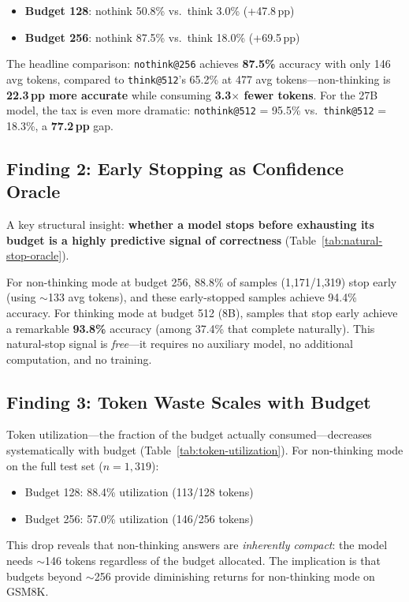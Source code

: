 \begin{itemize}[nosep,leftmargin=*]
    \item \textbf{Budget 128}: nothink 50.8\% vs.\ think 3.0\% (+47.8\,pp)
    \item \textbf{Budget 256}: nothink 87.5\% vs.\ think 18.0\% (+69.5\,pp)
\end{itemize}

The headline comparison: \texttt{nothink@256} achieves \textbf{87.5\%} accuracy with only 146 avg tokens, compared to \texttt{think@512}'s 65.2\% at 477 avg tokens---non-thinking is \textbf{22.3\,pp more accurate} while consuming \textbf{3.3$\times$ fewer tokens}.
For the 27B model, the tax is even more dramatic: \texttt{nothink@512} = 95.5\% vs.\ \texttt{think@512} = 18.3\%, a \textbf{77.2\,pp} gap.

\subsection{Finding 2: Early Stopping as Confidence Oracle}
\label{sec:finding2}



A key structural insight: \textbf{whether a model stops before exhausting its budget is a highly predictive signal of correctness} (Table~\ref{tab:natural-stop-oracle}).

For non-thinking mode at budget 256, 88.8\% of samples (1{,}171/1{,}319) stop early (using ${\sim}$133 avg tokens), and these early-stopped samples achieve 94.4\% accuracy.
For thinking mode at budget 512 (8B), samples that stop early achieve a remarkable \textbf{93.8\%} accuracy (among 37.4\% that complete naturally).
This natural-stop signal is \emph{free}---it requires no auxiliary model, no additional computation, and no training.

\subsection{Finding 3: Token Waste Scales with Budget}
\label{sec:finding3}



Token utilization---the fraction of the budget actually consumed---decreases systematically with budget (Table~\ref{tab:token-utilization}).
For non-thinking mode on the full test set ($n{=}1{,}319$):
\begin{itemize}[nosep,leftmargin=*]
    \item Budget 128: 88.4\% utilization (113/128 tokens)
    \item Budget 256: 57.0\% utilization (146/256 tokens)
\end{itemize}
This drop reveals that non-thinking answers are \emph{inherently compact}: the model needs ${\sim}$146 tokens regardless of the budget allocated.
The implication is that budgets beyond ${\sim}$256 provide diminishing returns for non-thinking mode on GSM8K.
